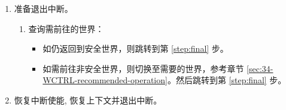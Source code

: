 \documentclass[main\_\_CN.tex]{subfiles}
\begin{document}
\begin{enumerate}
\begin{itemize}
\begin{enumerate}
                    \item 跳转至第 \ref{step:last-step} 步。
                \end{enumerate}
                \item 0-31：表示仍有未处理的中断，CPU 将跳转至入口  处的中断。此时：
                    \begin{itemize}
                        \item 更新入口  的世界切换寄存器：
                        \begin{itemize}
                            \item \hyperref[fielddesc:WCLCORE0CURRENT0]{WCL\_CORE\_0\_CURRENT\_} 为 0，表示中断已不再  处。
                            \item \hyperref[fielddesc:WCLCORE0FROMWORLD0]{WCL\_CORE\_0\_FROM\_WORLD\_} 和 \hyperref[fielddesc:WCLCORE0FROMENTRY0]{WCL\_CORE\_0\_FROM\_ENTRY\_} 保持不变。
                        \end{itemize}
                        \item 更新入口  的世界切换寄存器：
                        \begin{itemize}
                            \item 更新  的  \hyperref[fielddesc:WCLCORE0CURRENT0]{WCL\_CORE\_0\_CURRENT\_} 为 1，表示 CPU 将返回入口 。
                        \end{itemize}
                    \end{itemize}
            \end{itemize}
        \item 准备退出中断。\label{step:last-step}
            \begin{enumerate}
                \item 查询需前往的世界：
                    \begin{itemize}
                        \item 如仍返回到安全世界，则跳转到第 \ref{step:final} 步。
                        \item 如需前往非安全世界，则切换至需要的世界，参考章节 \ref{sec:34-WCTRL-recommended-operation}。然后跳转到第 \ref{step:final} 步。
                    \end{itemize}
            \end{enumerate}
        \item 恢复中断使能, 恢复上下文并退出中断。 \label{step:final}
\end{enumerate}
\end{document}
